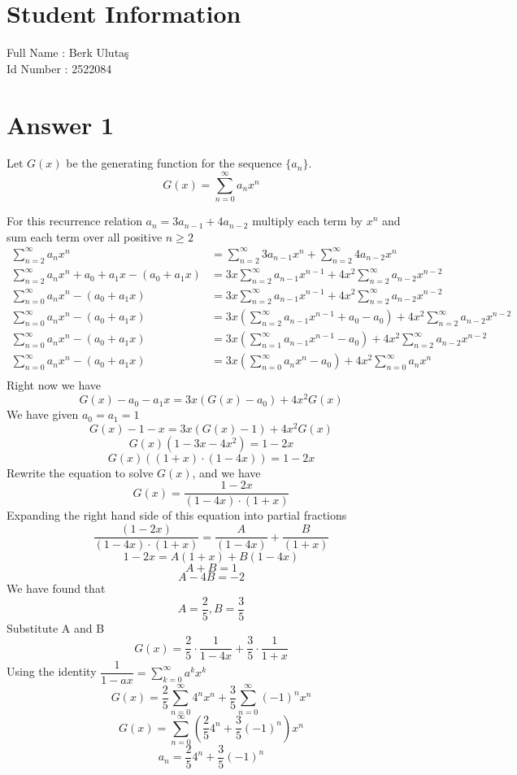 \documentclass[12pt]{article}
\begin{document}
\section*{Student Information } 
Full Name : Berk Ulutaş \\
Id Number : 2522084 \\

\section*{Answer 1}

Let $G(x)$ be the generating function for the sequence $\{a_n\}$. $$G(x) = \sum_{n=0}^\infty a_n x^n$$

For this recurrence relation $a_n = 3a_{n-1} + 4a_{n-2} $ multiply each term by $x^n$ and sum each term over all positive $n \geq 2 $
\begin{align*}
    \sum_{n=2}^\infty a_n x^n &= \sum_{n=2}^\infty 3 a_{n-1} x^n + \sum_{n=2}^\infty 4a_{n-2}x^n \\
    \sum_{n=2}^\infty a_n x^n + a_0 + a_1x -(a_0 + a_1x) &= 3x\sum_{n=2}^\infty a_{n-1} x^{n-1} + 4x^2\sum_{n=2}^\infty a_{n-2}x^{n-2} \\
    \sum_{n=0}^\infty a_n x^n -(a_0 + a_1x) &= 3x\sum_{n=2}^\infty a_{n-1} x^{n-1} + 4x^2\sum_{n=2}^\infty a_{n-2}x^{n-2} \\
    \sum_{n=0}^\infty a_n x^n -(a_0 + a_1x) &= 3x(\sum_{n=2}^\infty a_{n-1} x^{n-1} + a_0 - a_0) + 4x^2\sum_{n=2}^\infty a_{n-2}x^{n-2} \\ 
    \sum_{n=0}^\infty a_n x^n -(a_0 + a_1x) &= 3x(\sum_{n=1}^\infty a_{n-1} x^{n-1} - a_0) + 4x^2\sum_{n=2}^\infty a_{n-2}x^{n-2} \\
    \sum_{n=0}^\infty a_n x^n -(a_0 + a_1x) &= 3x(\sum_{n=0}^\infty a_{n} x^{n} - a_0) + 4x^2\sum_{n=0}^\infty a_{n}x^{n} \\
\end{align*}
Right now we have
$$G(x) - a_0 - a_1x = 3x(G(x) - a_0) + 4x^2G(x)$$
We have given $a_0  = a_1 = 1$ 
$$G(x) - 1 - x = 3x(G(x) - 1) + 4x^2G(x)$$
$$G(x)(1-3x-4x^2) = 1-2x$$
$$G(x)((1+x)\cdot(1-4x)) = 1-2x$$
Rewrite the equation to solve $G(x)$, and we have
$$G(x) = \dfrac{1-2x}{(1-4x)\cdot(1+x)}$$
Expanding the right hand side of this equation into partial fractions
$$\dfrac{(1-2x)}{(1-4x)\cdot(1+x)} = \dfrac{A}{(1-4x)} + \dfrac{B}{(1+x)}$$
$$1-2x = A(1+x) + B(1-4x)$$
$$ A + B = 1$$
$$ A - 4B = -2$$
We have found that
$$ A = \frac{2}{5}, B = \frac{3}{5} $$
Substitute A and B
$$G(x) = \dfrac{2}{5} \cdot \dfrac{1}{1-4x} + \dfrac{3}{5} \cdot \dfrac{1}{1+x}$$
Using the identity $\dfrac{1}{1-ax} = \sum_{k=0}^\infty a^kx^k$
$$G(x) = \dfrac{2}{5} \sum_{n=0}^\infty  4^nx^n + \dfrac{3}{5} \sum_{n=0}^\infty  (-1)^nx^n$$
$$G(x) = \sum_{n=0}^\infty (\dfrac{2}{5} 4^n + \dfrac{3}{5} (-1)^n)x^n$$
$$a_n = \dfrac{2}{5} 4^n + \dfrac{3}{5} (-1)^n $$
\end{document}
